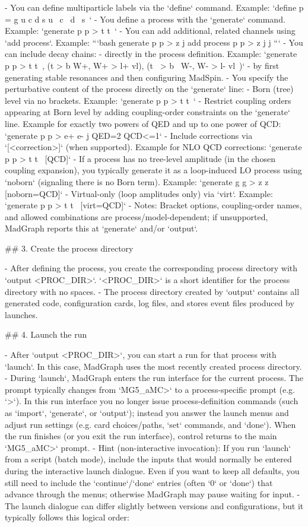 \documentclass[submission, Phys]{SciPost}
\begin{document}
\begin{promptblocklit}
- You can define multiparticle labels via the `define` command. Example: `define p = g u c d s u~ c~ d~ s~`
- You define a process with the `generate` command. Example: `generate p p > t t~`
- You can add additional, related channels using `add process`. Example:
  ```bash
  generate p p > z j
  add process p p > z j j
  ```
- You can include decay chains:
  - directly in the process definition. Example: `generate p p > t t~, (t > b W+, W+ > l+ vl), (t~ > b~ W-, W- > l- vl~)`
  - by first generating stable resonances and then configuring MadSpin.
- You specify the perturbative content of the process directly on the `generate` line:
  - Born (tree) level via no brackets. Example: `generate p p > t t~`
  - Restrict coupling orders appearing at Born level by adding coupling-order constraints on the `generate` line.
    Example for exactly two powers of QED and up to one power of QCD: `generate p p > e+ e- j QED=2 QCD<=1`
  - Include corrections via `[<correction>]` (when supported).
    Example for NLO QCD corrections: `generate p p > t t~ [QCD]`
  - If a process has no tree-level amplitude (in the chosen coupling expansion), you typically generate it as a loop-induced LO process using `noborn` (signaling there is no Born term).
    Example: `generate g g > z z [noborn=QCD]`
  - Virtual-only (loop amplitudes only) via `virt`. Example: `generate p p > t t~ [virt=QCD]`
  - Notes: Bracket options, coupling-order names, and allowed combinations are process/model-dependent; if unsupported, MadGraph reports this at `generate` and/or `output`.

## 3. Create the process directory

- After defining the process, you create the corresponding process directory with `output <PROC_DIR>`. `<PROC_DIR>` is a short identifier for the process directory with no spaces.
- The process directory created by `output` contains all generated code, configuration cards, log files, and stores event files produced by launches.

## 4. Launch the run

- After `output <PROC_DIR>`, you can start a run for that process with `launch`. In this case, MadGraph uses the most recently created process directory.
- During `launch`, MadGraph enters the run interface for the current process. The prompt typically changes from `MG5_aMC>` to a process-specific prompt (e.g. `>`). In this run interface you no longer issue process-definition commands (such as `import`, `generate`, or `output`); instead you answer the launch menus and adjust run settings (e.g. card choices/paths, `set` commands, and `done`). When the run finishes (or you exit the run interface), control returns to the main `MG5_aMC>` prompt.
- Hint (non-interactive invocation): If you run `launch` from a script (batch mode), include the inputs that would normally be entered during the interactive launch dialogue. Even if you want to keep all defaults, you still need to include the `continue`/`done` entries (often `0` or `done`) that advance through the menus; otherwise MadGraph may pause waiting for input.
- The launch dialogue can differ slightly between versions and configurations, but it typically follows this logical order:


\end{promptblocklit}
\end{document}
